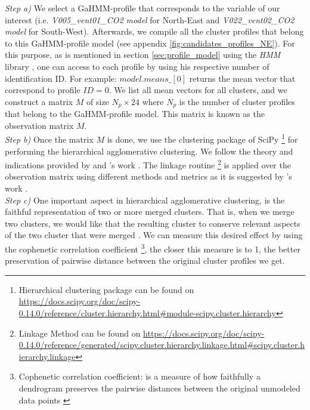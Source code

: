 \textit{Step a)} We select a GaHMM-profile that corresponds to the variable of our interest (i.e. \textit{V005\_vent01\_CO2 model} for North-East and \textit{V022\_vent02\_CO2 model} for South-West). Afterwards, we compile all the cluster profiles that belong to this GaHMM-profile model (see appendix
\ref{fig:candidates_profiles_NE}). For this purpose, as is mentioned in section \ref{sec:profile_model} using the \textit{HMM} library \cite{gahmm_manual}, one can access to each profile by using his respective number of identification ID. For example: $model.means\_[0]$ returns the mean vector that correspond to profile $ID = 0$. We list all mean vectors for all clusters, and we construct a matrix $M$ of size $N_p \times 24$ where $N_p$ is the number of cluster profiles that belong to the GaHMM-profile model. This matrix is known as the observation matrix $M$. \\


\textit{Step b)} Once the matrix $M$ is done, we use the clustering package of SciPy \footnote{Hierarchical clustering package can be found on  \url{https://docs.scipy.org/doc/scipy-0.14.0/reference/cluster.hierarchy.html\#module-scipy.cluster.hierarchy}} for performing the hierarchical agglomerative clustering. We follow the theory and indications provided by \citeauthor{mullner2011modern} and \citeauthor{saraccli2013comparison}'s work \cite{mullner2011modern,saraccli2013comparison}. The linkage routine \footnote{Linkage Method can be found on \url{https://docs.scipy.org/doc/scipy-0.14.0/reference/generated/scipy.cluster.hierarchy.linkage.html\#scipy.cluster.hierarchy.linkage} } is applied over the observation matrix using different methods and metrics as it is suggested by \citeauthor{saraccli2013comparison}'s work \cite{saraccli2013comparison}. \\  


\textit{Step c)} One important aspect in hierarchical agglomerative clustering, is the faithful representation of two or more merged clusters. That is, when we merge two clusters, we would like that the resulting cluster to conserve relevant aspects of the two cluster that were merged \cite{saraccli2013comparison}. We
can measure this desired effect by using the cophenetic correlation coefficient \footnote{Cophenetic correlation coefficient: is a measure of how faithfully a dendrogram preserves the pairwise distances between the original unmodeled data points \cite{saraccli2013comparison}}, the closer this measure is to 1, the better preservation of pairwise distance between the original cluster profiles we get.\\  


